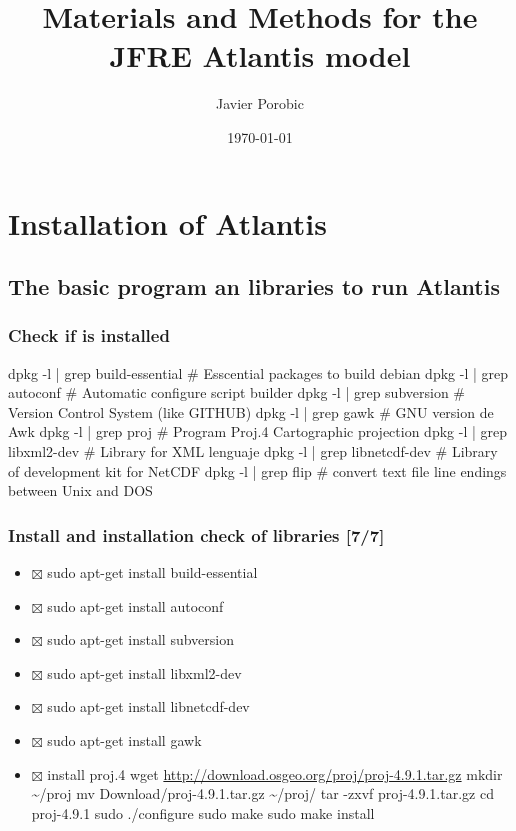\documentclass[11pt]{article}
\title{Materials and Methods for the JFRE Atlantis model}
\author{Javier Porobic}
\date{\today}
\begin{document}
\maketitle

\section*{Installation of Atlantis}
\label{sec-1}
\subsection*{The basic program an libraries to run Atlantis}
\label{sec-1-1}
\subsubsection*{Check if is installed}
\label{sec-1-1-1}

dpkg -l | grep build-essential   \# Esscential packages to build debian
dpkg -l | grep autoconf          \# Automatic configure script builder
dpkg -l | grep subversion        \# Version Control System (like GITHUB)
dpkg -l | grep gawk              \# GNU version de Awk
dpkg -l | grep proj              \# Program Proj.4 Cartographic projection
dpkg -l | grep libxml2-dev       \# Library for XML lenguaje
dpkg -l | grep libnetcdf-dev     \# Library of development kit for NetCDF
dpkg -l | grep flip              \# convert text file line endings between Unix and DOS
\subsubsection*{Install and installation check of libraries [7/7]}
\label{sec-1-1-2}

\begin{itemize}
\item $\boxtimes$ sudo apt-get install build-essential
\item $\boxtimes$ sudo apt-get install autoconf
\item $\boxtimes$ sudo apt-get install subversion
\item $\boxtimes$ sudo apt-get install libxml2-dev
\item $\boxtimes$ sudo apt-get install libnetcdf-dev
\item $\boxtimes$ sudo apt-get install gawk
\item $\boxtimes$ install proj.4
    wget \href{http://download.osgeo.org/proj/proj-4.9.1.tar.gz}{http://download.osgeo.org/proj/proj-4.9.1.tar.gz}
    mkdir \~{}/proj
    mv Download/proj-4.9.1.tar.gz \~{}/proj/
    tar -zxvf proj-4.9.1.tar.gz
    cd proj-4.9.1
    sudo ./configure
    sudo make
    sudo make install
\end{itemize}
\end{document}
